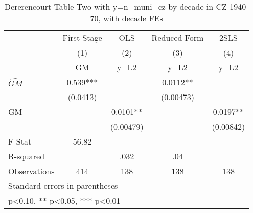\begin{table}[htbp]\centering
\def\sym#1{\ifmmode^{#1}\else\(^{#1}\)\fi}
\caption{Dererencourt Table Two with y=n\_muni\_cz by decade in CZ 1940-70, with decade FEs}
\begin{tabular}{l*{4}{c}}
\toprule
                    & First Stage   &         OLS   &Reduced Form   &        2SLS   \\
                    &\multicolumn{1}{c}{(1)}&\multicolumn{1}{c}{(2)}&\multicolumn{1}{c}{(3)}&\multicolumn{1}{c}{(4)}\\
                    &\multicolumn{1}{c}{GM}&\multicolumn{1}{c}{y\_L2}&\multicolumn{1}{c}{y\_L2}&\multicolumn{1}{c}{y\_L2}\\
\midrule
$\hat{GM}$          &       0.539***&               &      0.0112** &               \\
                    &    (0.0413)   &               &   (0.00473)   &               \\
\addlinespace
GM                  &               &      0.0101** &               &      0.0197** \\
                    &               &   (0.00479)   &               &   (0.00842)   \\
\midrule
F-Stat              &       56.82   &               &               &               \\
R-squared           &               &        .032   &         .04   &               \\
Observations        &         414   &         138   &         138   &         138   \\
\bottomrule
\multicolumn{5}{l}{\footnotesize Standard errors in parentheses}\\
\multicolumn{5}{l}{\footnotesize * p<0.10, ** p<0.05, *** p<0.01}\\
\end{tabular}
\end{table}
